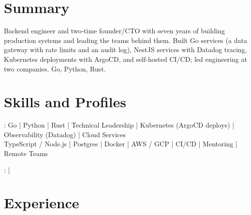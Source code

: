 \documentclass[print]{jack-resume}
\begin{document}
\pagecolor{darkmodeBackground}


\begin{minipage}[t][1cm][t]{.03\textwidth}
    \hfill
\end{minipage}

\section{Summary}
Backend engineer and two-time founder/CTO with seven years of building production systems and leading the teams behind them. Built Go services (a data gateway with rate limits and an audit log), NestJS services with Datadog tracing, Kubernetes deployments with ArgoCD, and self-hosted CI/CD; led engineering at two companies. Go, Python, Rust.
\sectionsep

\section{Skills and Profiles}
:
Go \hfill | \hfill
Python \hfill | \hfill
Rust \hfill | \hfill
Technical Leadership \hfill | \hfill
Kubernetes (ArgoCD deploys) \hfill | \hfill
Observability (Datadog) \hfill | \hfill
Cloud Services \\
\hspace{1.0cm} TypeScript / Node.js \hfill | \hfill
Postgres \hfill | \hfill
Docker \hfill | \hfill
AWS / GCP \hfill | \hfill
CI/CD \hfill | \hfill
Mentoring \hfill | \hfill
Remote Teams \\

\raggedright{
    :
      \href{https://www.linkedin.com/in/jack-sturtevant/}{ \ExternalLink} |
     \href{https://github.com/jacksturt}{ \ExternalLink}}

\section{Experience}
\end{document}

